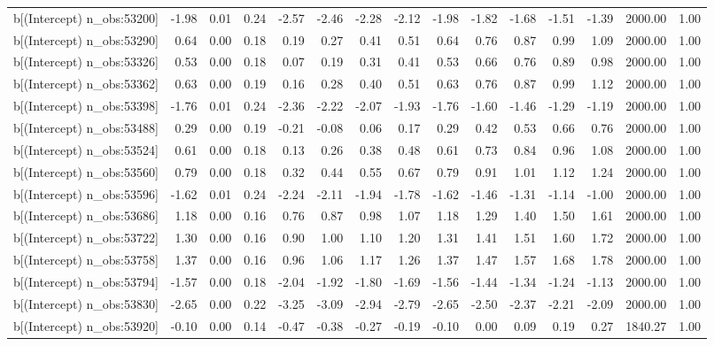\begin{table}[ht]
\begin{tabular}{rrrrrrrrrrrrrrr}
  b[(Intercept) n\_obs:53200] & -1.98 & 0.01 & 0.24 & -2.57 & -2.46 & -2.28 & -2.12 & -1.98 & -1.82 & -1.68 & -1.51 & -1.39 & 2000.00 & 1.00 \\ 
  b[(Intercept) n\_obs:53290] & 0.64 & 0.00 & 0.18 & 0.19 & 0.27 & 0.41 & 0.51 & 0.64 & 0.76 & 0.87 & 0.99 & 1.09 & 2000.00 & 1.00 \\ 
  b[(Intercept) n\_obs:53326] & 0.53 & 0.00 & 0.18 & 0.07 & 0.19 & 0.31 & 0.41 & 0.53 & 0.66 & 0.76 & 0.89 & 0.98 & 2000.00 & 1.00 \\ 
  b[(Intercept) n\_obs:53362] & 0.63 & 0.00 & 0.19 & 0.16 & 0.28 & 0.40 & 0.51 & 0.63 & 0.76 & 0.87 & 0.99 & 1.12 & 2000.00 & 1.00 \\ 
  b[(Intercept) n\_obs:53398] & -1.76 & 0.01 & 0.24 & -2.36 & -2.22 & -2.07 & -1.93 & -1.76 & -1.60 & -1.46 & -1.29 & -1.19 & 2000.00 & 1.00 \\ 
  b[(Intercept) n\_obs:53488] & 0.29 & 0.00 & 0.19 & -0.21 & -0.08 & 0.06 & 0.17 & 0.29 & 0.42 & 0.53 & 0.66 & 0.76 & 2000.00 & 1.00 \\ 
  b[(Intercept) n\_obs:53524] & 0.61 & 0.00 & 0.18 & 0.13 & 0.26 & 0.38 & 0.48 & 0.61 & 0.73 & 0.84 & 0.96 & 1.08 & 2000.00 & 1.00 \\ 
  b[(Intercept) n\_obs:53560] & 0.79 & 0.00 & 0.18 & 0.32 & 0.44 & 0.55 & 0.67 & 0.79 & 0.91 & 1.01 & 1.12 & 1.24 & 2000.00 & 1.00 \\ 
  b[(Intercept) n\_obs:53596] & -1.62 & 0.01 & 0.24 & -2.24 & -2.11 & -1.94 & -1.78 & -1.62 & -1.46 & -1.31 & -1.14 & -1.00 & 2000.00 & 1.00 \\ 
  b[(Intercept) n\_obs:53686] & 1.18 & 0.00 & 0.16 & 0.76 & 0.87 & 0.98 & 1.07 & 1.18 & 1.29 & 1.40 & 1.50 & 1.61 & 2000.00 & 1.00 \\ 
  b[(Intercept) n\_obs:53722] & 1.30 & 0.00 & 0.16 & 0.90 & 1.00 & 1.10 & 1.20 & 1.31 & 1.41 & 1.51 & 1.60 & 1.72 & 2000.00 & 1.00 \\ 
  b[(Intercept) n\_obs:53758] & 1.37 & 0.00 & 0.16 & 0.96 & 1.06 & 1.17 & 1.26 & 1.37 & 1.47 & 1.57 & 1.68 & 1.78 & 2000.00 & 1.00 \\ 
  b[(Intercept) n\_obs:53794] & -1.57 & 0.00 & 0.18 & -2.04 & -1.92 & -1.80 & -1.69 & -1.56 & -1.44 & -1.34 & -1.24 & -1.13 & 2000.00 & 1.00 \\ 
  b[(Intercept) n\_obs:53830] & -2.65 & 0.00 & 0.22 & -3.25 & -3.09 & -2.94 & -2.79 & -2.65 & -2.50 & -2.37 & -2.21 & -2.09 & 2000.00 & 1.00 \\ 
  b[(Intercept) n\_obs:53920] & -0.10 & 0.00 & 0.14 & -0.47 & -0.38 & -0.27 & -0.19 & -0.10 & 0.00 & 0.09 & 0.19 & 0.27 & 1840.27 & 1.00 \\ 

\end{tabular}
\end{table}
